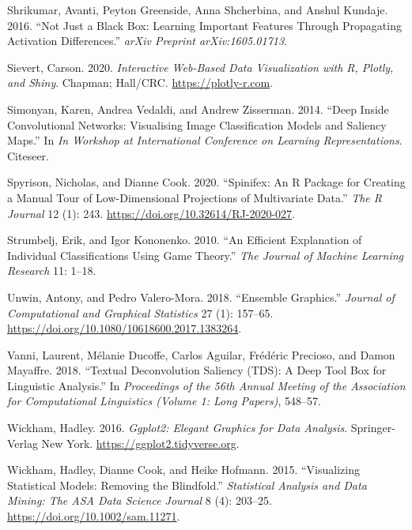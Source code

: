 \documentclass[
]{article}
\newlength{\cslhangindent}
\newlength{\cslentryspacingunit} %
\newenvironment{CSLReferences}[2] %
 {%
  \setlength{\parindent}{0pt}
  \ifodd #1
  \let\oldpar\par
  \def\par{\hangindent=\cslhangindent\oldpar}
  \fi
  \setlength{\parskip}{#2\cslentryspacingunit}
 }%
 {}
\begin{document}
\begin{CSLReferences}{1}{0}
\leavevmode{}%
Shrikumar, Avanti, Peyton Greenside, Anna Shcherbina, and Anshul Kundaje. 2016. {``Not Just a Black Box: {Learning} Important Features Through Propagating Activation Differences.''} \emph{arXiv Preprint arXiv:1605.01713}.

\leavevmode{}%
Sievert, Carson. 2020. \emph{Interactive {Web}-{Based} {Data} {Visualization} with {R}, Plotly, and Shiny}. Chapman; Hall/CRC. \url{https://plotly-r.com}.

\leavevmode{}%
Simonyan, Karen, Andrea Vedaldi, and Andrew Zisserman. 2014. {``Deep Inside Convolutional Networks: {Visualising} Image Classification Models and Saliency Maps.''} In \emph{In {Workshop} at {International} {Conference} on {Learning} {Representations}}. Citeseer.

\leavevmode{}%
Spyrison, Nicholas, and Dianne Cook. 2020. {``Spinifex: An {R} {Package} for {Creating} a {Manual} {Tour} of {Low}-Dimensional {Projections} of {Multivariate} {Data}.''} \emph{The R Journal} 12 (1): 243. \url{https://doi.org/10.32614/RJ-2020-027}.

\leavevmode{}%
Strumbelj, Erik, and Igor Kononenko. 2010. {``An Efficient Explanation of Individual Classifications Using Game Theory.''} \emph{The Journal of Machine Learning Research} 11: 1--18.

\leavevmode{}%
Unwin, Antony, and Pedro Valero-Mora. 2018. {``Ensemble Graphics.''} \emph{Journal of Computational and Graphical Statistics} 27 (1): 157--65. \url{https://doi.org/10.1080/10618600.2017.1383264}.

\leavevmode{}%
Vanni, Laurent, Mélanie Ducoffe, Carlos Aguilar, Frédéric Precioso, and Damon Mayaffre. 2018. {``Textual {Deconvolution} {Saliency} ({TDS}): A Deep Tool Box for Linguistic Analysis.''} In \emph{Proceedings of the 56th {Annual} {Meeting} of the {Association} for {Computational} {Linguistics} ({Volume} 1: {Long} {Papers})}, 548--57.

\leavevmode{}%
Wickham, Hadley. 2016. \emph{Ggplot2: {Elegant} {Graphics} for {Data} {Analysis}}. Springer-Verlag New York. \url{https://ggplot2.tidyverse.org}.

\leavevmode{}%
Wickham, Hadley, Dianne Cook, and Heike Hofmann. 2015. {``Visualizing Statistical Models: {Removing} the Blindfold.''} \emph{Statistical Analysis and Data Mining: The ASA Data Science Journal} 8 (4): 203--25. \url{https://doi.org/10.1002/sam.11271}.

\end{CSLReferences}
\end{document}

